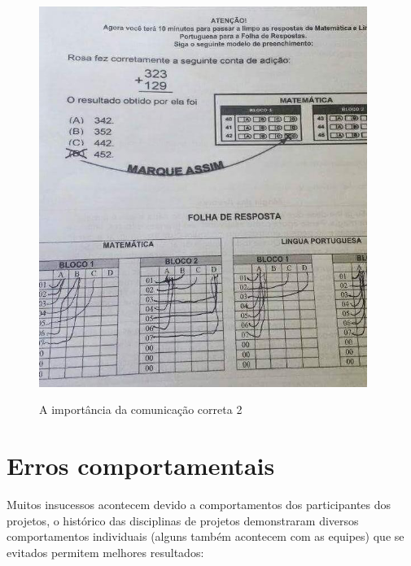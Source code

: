 \begin{figure}
    \centering
    \caption{A importância da comunicação correta 2}
	\includegraphics[width=0.95\textwidth]{erros/erro_de_comunicacao_gabarito_prova.jpg}
    \label{fig:gabarito-prova}
\end{figure}



\section{Erros comportamentais}

Muitos insucessos acontecem devido a comportamentos dos participantes dos projetos, o histórico das disciplinas de projetos demonstraram diversos comportamentos individuais (alguns também acontecem com as equipes) que se evitados permitem melhores resultados:

